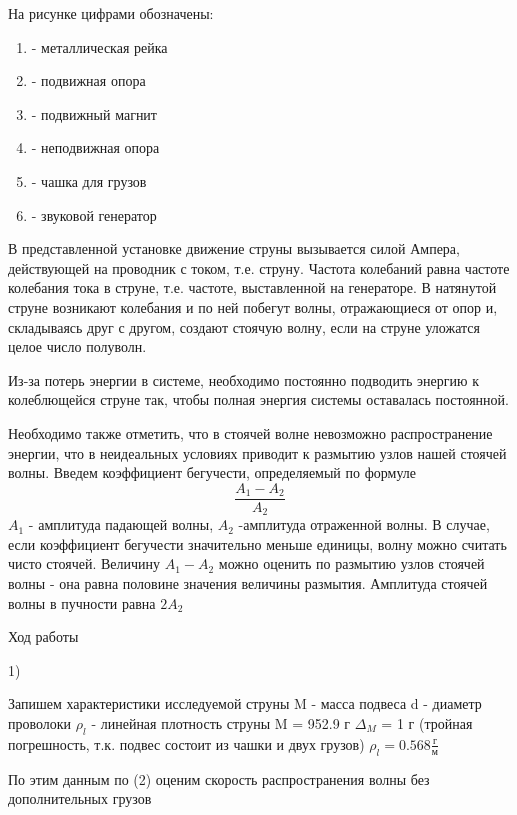 \documentclass[12pt,a4paper]{article}
\begin{document}
\par На рисунке цифрами обозначены:
\begin{enumerate}
\item - металлическая рейка
\item - подвижная опора
\item - подвижный магнит
\item - неподвижная опора
\item - чашка для грузов
\item - звуковой генератор
\end{enumerate}
\par В представленной установке движение струны вызывается силой Ампера, действующей на проводник с током, т.е. струну. Частота колебаний равна частоте колебания тока в струне, т.е. частоте, выставленной на генераторе. В натянутой струне возникают колебания и по ней побегут волны, отражающиеся от опор и, складываясь друг с другом, создают стоячую волну, если на струне уложатся целое число полуволн.
\par Из-за потерь энергии в системе, необходимо постоянно подводить энергию к колеблющейся струне так, чтобы полная энергия системы оставалась постоянной.
\par Необходимо также отметить, что в стоячей волне невозможно распространение энергии, что в неидеальных условиях приводит к размытию узлов нашей стоячей волны. Введем коэффициент бегучести, определяемый по формуле
\begin{equation}
\frac{A_{1} - A_{2}}{A_{2}}
\end{equation}
$A_{1}$ - амплитуда падающей волны, $A_{2}$  -амплитуда отраженной волны. В случае, если коэффициент бегучести значительно меньше единицы, волну можно считать чисто стоячей. Величину $A_{1} - A_{2}$ можно оценить по размытию узлов стоячей волны - она равна половине значения величины размытия. Амплитуда стоячей волны в пучности равна $2A_{2}$
\newpage
\begin{center}
\large Ход работы
\end{center}
1) \par Запишем характеристики исследуемой струны \hfill \break
M - масса подвеса \hfill \break
d - диаметр проволоки \hfill \break
$\rho_{l}$ - линейная плотность струны \hfill \break
M =  952.9 г \;\;\;\;\; $\Delta_{M}$ = 1 г (тройная погрешность, т.к. подвес состоит из чашки и двух грузов) \hfill \break
$\rho_{l} = 0.568 \frac{\text{г}}{\text{м}}$  \hfill \break
\par По этим данным по (2) оценим скорость распространения волны без дополнительных грузов \hfill \break
\end{document}
